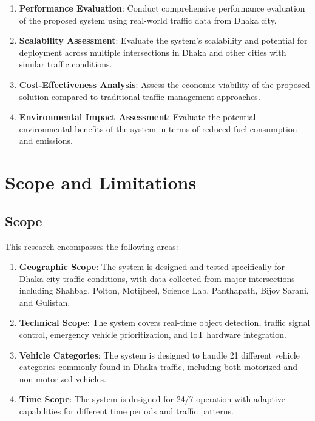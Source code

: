 \begin{enumerate}
    \item \textbf{Performance Evaluation}: Conduct comprehensive performance evaluation of the proposed system using real-world traffic data from Dhaka city.
    
    \item \textbf{Scalability Assessment}: Evaluate the system's scalability and potential for deployment across multiple intersections in Dhaka and other cities with similar traffic conditions.
    
    \item \textbf{Cost-Effectiveness Analysis}: Assess the economic viability of the proposed solution compared to traditional traffic management approaches.
    
    \item \textbf{Environmental Impact Assessment}: Evaluate the potential environmental benefits of the system in terms of reduced fuel consumption and emissions.
\end{enumerate}

\section{Scope and Limitations}

\subsection{Scope}

This research encompasses the following areas:

\begin{enumerate}
    \item \textbf{Geographic Scope}: The system is designed and tested specifically for Dhaka city traffic conditions, with data collected from major intersections including Shahbag, Polton, Motijheel, Science Lab, Panthapath, Bijoy Sarani, and Gulistan.
    
    \item \textbf{Technical Scope}: The system covers real-time object detection, traffic signal control, emergency vehicle prioritization, and IoT hardware integration.
    
    \item \textbf{Vehicle Categories}: The system is designed to handle 21 different vehicle categories commonly found in Dhaka traffic, including both motorized and non-motorized vehicles.
    
    \item \textbf{Time Scope}: The system is designed for 24/7 operation with adaptive capabilities for different time periods and traffic patterns.
\end{enumerate}

